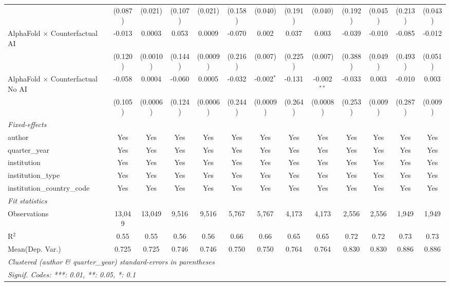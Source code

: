 \begin{tabular}{lcccccccccccc}
                                            & (0.087) & (0.021)  & (0.107) & (0.021)  & (0.158) & (0.040)      & (0.191) & (0.040)       & (0.192) & (0.045) & (0.213) & (0.043)\\   
   AlphaFold $\times$ Counterfactual AI     & -0.013  & 0.0003   & 0.053   & 0.0009   & -0.070  & 0.002        & 0.037   & 0.003         & -0.039  & -0.010  & -0.085  & -0.012\\   
                                            & (0.120) & (0.0010) & (0.144) & (0.0009) & (0.216) & (0.007)      & (0.225) & (0.007)       & (0.388) & (0.049) & (0.493) & (0.051)\\   
   AlphaFold $\times$ Counterfactual No AI  & -0.058  & 0.0004   & -0.060  & 0.0005   & -0.032  & -0.002$^{*}$ & -0.131  & -0.002$^{**}$ & -0.033  & 0.003   & -0.010  & 0.003\\   
                                            & (0.105) & (0.0006) & (0.124) & (0.0006) & (0.244) & (0.0009)     & (0.264) & (0.0008)      & (0.253) & (0.009) & (0.287) & (0.009)\\   
   \midrule
   \emph{Fixed-effects}\\
   author                                   & Yes     & Yes      & Yes     & Yes      & Yes     & Yes          & Yes     & Yes           & Yes     & Yes     & Yes     & Yes\\  
   quarter\_year                            & Yes     & Yes      & Yes     & Yes      & Yes     & Yes          & Yes     & Yes           & Yes     & Yes     & Yes     & Yes\\  
   institution                              & Yes     & Yes      & Yes     & Yes      & Yes     & Yes          & Yes     & Yes           & Yes     & Yes     & Yes     & Yes\\  
   institution\_type                        & Yes     & Yes      & Yes     & Yes      & Yes     & Yes          & Yes     & Yes           & Yes     & Yes     & Yes     & Yes\\  
   institution\_country\_code               & Yes     & Yes      & Yes     & Yes      & Yes     & Yes          & Yes     & Yes           & Yes     & Yes     & Yes     & Yes\\  
   \midrule
   \emph{Fit statistics}\\
   Observations                             & 13,049  & 13,049   & 9,516   & 9,516    & 5,767   & 5,767        & 4,173   & 4,173         & 2,556   & 2,556   & 1,949   & 1,949\\  
   R$^2$                                    & 0.55    & 0.55     & 0.56    & 0.56     & 0.66    & 0.66         & 0.65    & 0.65          & 0.72    & 0.72    & 0.73    & 0.73\\  
Mean(Dep. Var.) & 0.725 & 0.725 & 0.746 & 0.746 & 0.750 & 0.750 & 0.764 & 0.764 & 0.830 & 0.830 & 0.886 & 0.886 \\
   \midrule \midrule
   \multicolumn{13}{l}{\emph{Clustered (author \& quarter\_year) standard-errors in parentheses}}\\
   \multicolumn{13}{l}{\emph{Signif. Codes: ***: 0.01, **: 0.05, *: 0.1}}\\
\end{tabular}
\par\endgroup
